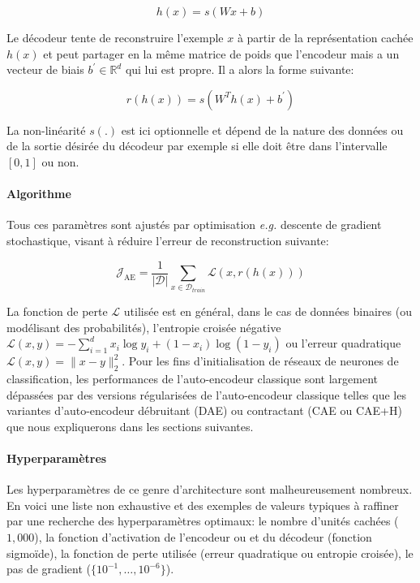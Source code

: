 \begin{equation}
h(x)=s(Wx+b)
\end{equation}

Le décodeur tente de reconstruire l'exemple $x$ à partir de la représentation
cachée $h(x)$ et peut partager en la m\^eme matrice de poids que l'encodeur
mais a un vecteur de biais $b^{'}\in\mathbb{R}^d$ qui lui est propre. Il a
alors la forme suivante:

\begin{equation}
r(h(x))=s(W^{T} h(x)+b^{'}) \label{eq:autoenc}
\end{equation} 

La non-linéarité $s(.)$ est ici optionnelle et dépend de la nature des données
ou de la sortie désirée du décodeur par exemple si elle doit \^etre dans
l'intervalle $[0,1]$ ou non.  \\

\paragraph{Algorithme}
Tous ces paramètres sont ajustés par optimisation \textit{e.g.} descente de
gradient stochastique, visant à réduire l'erreur de reconstruction suivante:

\begin{equation}
\mathcal{J}_{\textrm{AE}} = \frac{1}{\vert \mathcal{D}\vert}\sum_{x\in\mathcal{D}_{train}}\mathcal{L}(x,r(h(x)))
\label{eq:ae}
\end{equation}

La fonction de perte $\mathcal{L}$ utilisée est en général, dans le cas de
données binaires (ou modélisant des probabilités), l'entropie croisée négative
$\mathcal{L}(x,y) = -\sum_{i=1}^d x_i\log y_i + (1-x_i)\log(1-y_i)$ ou l'erreur
quadratique $\mathcal{L}(x,y) = \| x-y\|^2_2$. Pour les fins d'initialisation
de réseaux de neurones de classification, les performances de l'auto-encodeur
classique sont largement dépassées par des versions régularisées de
l'auto-encodeur classique telles que les variantes d'auto-encodeur débruitant
(DAE) ou contractant (CAE ou CAE+H) que nous expliquerons dans les sections
suivantes.

\paragraph{Hyperparamètres} Les hyperparamètres de ce genre d'architecture sont
malheureusement nombreux. En voici une liste non exhaustive et des exemples de
valeurs typiques à raffiner par une recherche des hyperparamètres optimaux: le
nombre d'unités cachées ($1,000$), la fonction d'activation de l'encodeur ou et
du décodeur (fonction sigmoïde), la fonction de perte utilisée (erreur quadratique ou entropie
croisée), le pas de gradient ($\lbrace 10^{-1},\dots,10^{-6}\rbrace$).  \\

